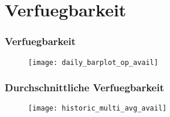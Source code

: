 \section{Verfuegbarkeit}
\begin{frame}
    \frametitle{Verfuegbarkeit}

    \begin{figure}
        \centering
        \texttt{[image: daily\_barplot\_op\_avail]}
    \end{figure}

\end{frame}

\begin{frame}
    \frametitle{Durchschnittliche Verfuegbarkeit}

    \begin{figure}
        \centering
        \texttt{[image: historic\_multi\_avg\_avail]}
    \end{figure}

\end{frame}